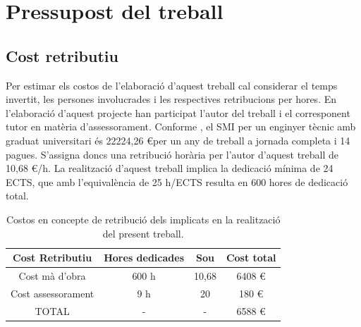 \chapter{Pressupost del treball}
\section{Cost retributiu}
\par Per estimar els costos de l'elaboració d'aquest treball cal considerar el temps invertit, les persones involucrades i les respectives retribucions per hores. En l'elaboració d'aquest projecte han participat l'autor del treball i el corresponent tutor en matèria d'assessorament. Conforme \cite{BOEsal}, el SMI per un enginyer tècnic amb graduat universitari és 22224,26 \euro per un any de treball a jornada completa i 14 pagues. S'assigna doncs una retribució horària per l'autor d'aquest treball de 10,68 \euro/h. La realització d'aquest treball implica la dedicació mínima de 24 ECTS, que amb l'equivalència de 25 h/ECTS resulta en 600 hores de dedicació total. 
\begin{table}[H]
    \centering
    \begin{tabular}{ | c | c | c | c |}
    \hline
    \textbf{Cost Retributiu}     &  \textbf{Hores dedicades} & \textbf{Sou}& \textbf{Cost total}\\ [2ex] \hline
    Cost mà d'obra   & 600 h & 10,68 & 6408 \euro \\ \hline
    Cost assessorament  & 9 h & 20 & 180 \euro \\ \hline
    \textsc{TOTAL}    &  -  & - & 6588 \euro \\ \hline
    \end{tabular}
    \caption{Costos en concepte de retribució dels implicats en la realització del present treball.}
    \label{taula_salaris}
\end{table}

